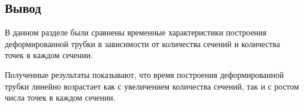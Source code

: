 \subsection{Вывод}

\noindent
\hspace{1.25cm}
В данном разделе были сравнены временные характеристики построения деформированной трубки в зависимости от количества сечений и количества точек в каждом сечении. 

\noindent
\hspace{1.25cm}
Полученные результаты показывают, что время построения деформированной трубки линейно возрастает как с увеличением количества сечений, так и с ростом числа точек в каждом сечении.